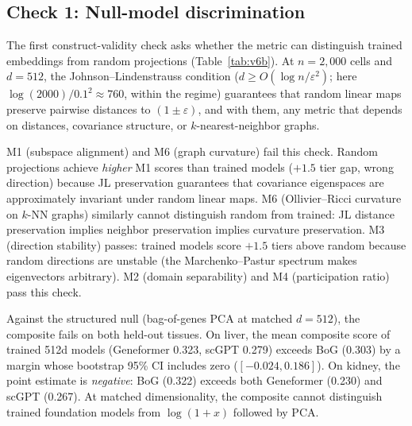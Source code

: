 \documentclass[10pt,letterpaper]{article}
\begin{document}
\subsection{Check 1: Null-model discrimination}

The first construct-validity check asks whether the metric can distinguish trained embeddings from random projections (Table~\ref{tab:v6b}). At $n = 2{,}000$ cells and $d = 512$, the Johnson--Lindenstrauss condition ($d \geq O(\log n / \varepsilon^2)$; here $\log(2000) / 0.1^2 \approx 760$, within the regime) guarantees that random linear maps preserve pairwise distances to $(1 \pm \varepsilon)$, and with them, any metric that depends on distances, covariance structure, or $k$-nearest-neighbor graphs.

M1 (subspace alignment) and M6 (graph curvature) fail this check. Random projections achieve \emph{higher} M1 scores than trained models ($+1.5$ tier gap, wrong direction) because JL preservation guarantees that covariance eigenspaces are approximately invariant under random linear maps. M6 (Ollivier--Ricci curvature on $k$-NN graphs) similarly cannot distinguish random from trained: JL distance preservation implies neighbor preservation implies curvature preservation. M3 (direction stability) passes: trained models score $+1.5$ tiers above random because random directions are unstable (the Marchenko--Pastur spectrum makes eigenvectors arbitrary). M2 (domain separability) and M4 (participation ratio) pass this check.

Against the structured null (bag-of-genes PCA at matched $d = 512$), the composite fails on both held-out tissues. On liver, the mean composite score of trained 512d models (Geneformer 0.323, scGPT 0.279) exceeds BoG (0.303) by a margin whose bootstrap 95\% CI includes zero ($[-0.024, 0.186]$). On kidney, the point estimate is \emph{negative}: BoG (0.322) exceeds both Geneformer (0.230) and scGPT (0.267). At matched dimensionality, the composite cannot distinguish trained foundation models from $\log(1+x)$ followed by PCA.
\end{document}
